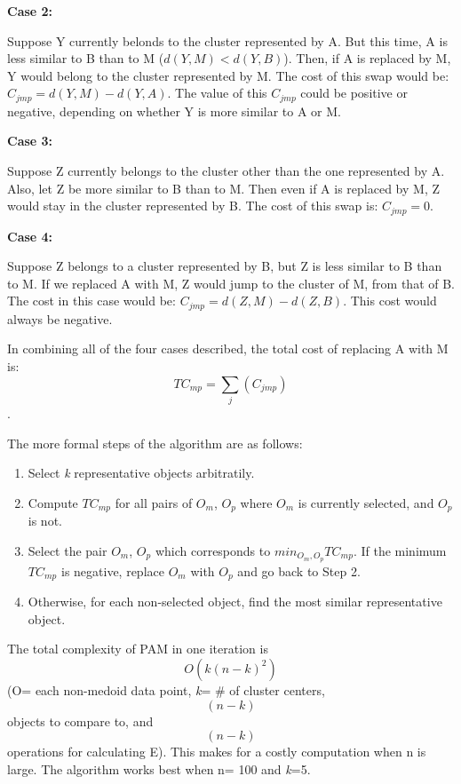 \documentclass[12pt,twoside]{amherstthesis}
\begin{document}
  \textbf{Case 2:}
  
  Suppose Y currently belonds to the cluster represented by A. But this
  time, A is less similar to B than to M (\(d(Y, M) < d(Y, B)\)). Then, if
  A is replaced by M, Y would belong to the cluster represented by M. The
  cost of this swap would be: \(C_{jmp} = d(Y, M) - d(Y, A)\). The value
  of this \(C_{jmp}\) could be positive or negative, depending on whether
  Y is more similar to A or M.
  
  \textbf{Case 3:}
  
  Suppose Z currently belongs to the cluster other than the one
  represented by A. Also, let Z be more similar to B than to M. Then even
  if A is replaced by M, Z would stay in the cluster represented by B. The
  cost of this swap is: \(C_{jmp} = 0\).
  
  \textbf{Case 4:}
  
  Suppose Z belongs to a cluster represented by B, but Z is less similar
  to B than to M. If we replaced A with M, Z would jump to the cluster of
  M, from that of B. The cost in this case would be:
  \(C_{jmp} = d(Z, M) - d(Z, B)\). This cost would always be negative.
  
  In combining all of the four cases described, the total cost of
  replacing A with M is: \[ TC_{mp} = \sum_j(C_{jmp}) \].
  
  The more formal steps of the algorithm are as follows:
  
  \begin{enumerate}
  \def\labelenumi{\arabic{enumi}.}
  \item
    Select \emph{k} representative objects arbitratily.
  \item
    Compute \(TC_{mp}\) for all pairs of \(O_m\), \(O_p\) where \(O_m\) is
    currently selected, and \(O_p\) is not.
  \item
    Select the pair \(O_m\), \(O_p\) which corresponds to
    \(min_{O_m, O_p} TC_{mp}\). If the minimum \(TC_{mp}\) is negative,
    replace \(O_m\) with \(O_p\) and go back to Step 2.
  \item
    Otherwise, for each non-selected object, find the most similar
    representative object.
  \end{enumerate}
  
  The total complexity of PAM in one iteration is \[O(k(n-k)^2)\] (O= each
  non-medoid data point, \emph{k}= \# of cluster centers, \[(n-k)\]
  objects to compare to, and \[(n-k)\] operations for calculating E). This
  makes for a costly computation when n is large. The algorithm works best
  when n= 100 and \emph{k}=5.
  
\end{document}
